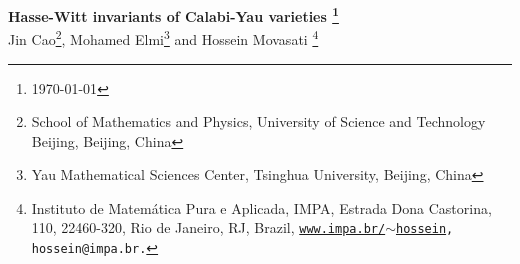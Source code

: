 \documentclass[11pt,leqno]{article}
\theoremstyle{remark}
\theoremstyle{definition}
\begin{document}
\def\hl{{\rm L}}    %
\def\imF{{\rm F}}
\def\imG{{\rm G}}



\def\HL{{\rm Ho}}     %
\def\NLL{{\rm NL}}   %

\def\RG{{\bf G}}          %
\def\rg{{\bf g}}     %
\def\rbullet{{\cdot}}%
\def\Ld{{\cal L}}      %
\def\Ro{{\rm R}}     %
\def\ZS{{\rm ZeSc}}     %
\def\ZI{{\rm ZeId}}     %
 \def\integ{{\rm Int}}  %

 
\def\tmap{{\sf t}}


\def\ivhs{{\rm IVHS}}    %
\def\ivhsmaps{{{\Delta}_{}}}   %
\def\sch{{\rm Sch}}   %
\def\mk{{\mathfrak  m}}   %
\def\pk{{\mathfrak  p}}   %
\def\qk{{\mathfrak  q}}   %




\newcommand\licy[1]{{\mathbb P}^{#1}} %







\def\SS{\mathscr{S}}    %





\begin{center}
{\LARGE\bf Hasse-Witt invariants of Calabi-Yau varieties \footnote{\today}
}
\\
\vspace{.1in} {\large {\sc Jin Cao\footnote{School of Mathematics and Physics, University of Science and Technology Beijing, Beijing, China}, Mohamed Elmi\footnote{Yau Mathematical Sciences Center, Tsinghua University, Beijing, China} and Hossein Movasati}}
\footnote{
Instituto de Matem\'atica Pura e Aplicada, IMPA, Estrada Dona Castorina, 110, 22460-320, Rio de Janeiro, RJ, Brazil,
{\tt \href{http://w3.impa.br/~hossein/}{www.impa.br/$\sim$hossein}, hossein@impa.br.}}
\end{center}







\begin{abstract}
We define the Hasse-Witt invariant of Calabi-Yau varieties in two different ways. The first method is through Cartier operator and the second method is through the theory of Calabi-Yau modular forms developed by the third author. We conjecture that these two definitions are equivalent and provide many examples of Calabi-Yau varieties in support of this conjecture. 
\end{abstract}
\end{document}
